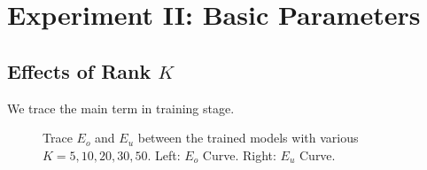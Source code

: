 \documentclass{article} %
\begin{document}
\section{Experiment II: Basic Parameters} %

\subsection{Effects of Rank $K$}
We trace the main term in training stage.
\begin{figure}[hp]
    \centering
    \captionsetup{justification=centering}
    \caption{Trace $E_o$ and $E_u$ between the trained models with various
        $K=5,10,20,30,50$. \newline
        Left: $E_o$ Curve. Right: $E_u$ Curve. } 
    \label{EffectK:Eo_Eu}
\end{figure}
\end{document}
